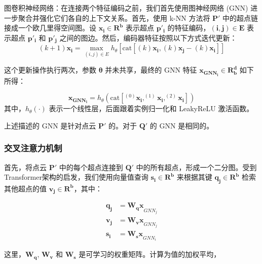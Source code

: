图卷积神经网络：在连接两个特征编码之前，我们首先使用图神经网络 (GNN) 进一步聚合并强化它们各自的上下文关系。首先，使用 k-NN 方法将 $\boldsymbol{P'}$ 中的超点链接成一个欧几里得空间图。设 $\boldsymbol{x_i \in R^b}$ 表示超点 $\boldsymbol{p'_i}$ 的特征编码，$\boldsymbol{(i, j) \in E}$ 表示超点 $\boldsymbol{p'_i}$ 和 $\boldsymbol{p'_j}$ 之间的图边。然后，编码器特征按照以下方式迭代更新：
\begin{equation}
    (k+1)\boldsymbol{x_i} = \max_{(i,j) \in E} h_{\theta} \left[ \text{cat} \left[(k)\boldsymbol{x_i}, (k)\boldsymbol{x_j} - (k)\boldsymbol{x_i} \right] \right]
\end{equation}

这个更新操作执行两次，参数 $\boldsymbol{\theta}$ 并未共享，最终的 GNN 特征 $\boldsymbol{x_{GNN_i} \in R^{d}_b}$ 如下所得：

\begin{equation}
\boldsymbol{x_{GNN_i}} = h_{\theta}(\text{cat}[^{(0)}\boldsymbol{x_i}, ^{(1)}\boldsymbol{x_i}, ^{(2)}\boldsymbol{x_i}])
\end{equation}
其中，$h_{\theta}(·)$ 表示一个线性层，后面跟着实例归一化和 LeakyReLU 激活函数。

上述描述的 GNN 是针对点云 $\boldsymbol{P'}$ 的。对于 $\boldsymbol{Q'}$ 的 GNN 是相同的。

\subsubsection{交叉注意力机制}首先，将点云 $\boldsymbol{P'}$ 中的每个超点连接到 $\boldsymbol{Q'}$ 中的所有超点，形成一个二分图。受到Transformer架构的启发，我们使用向量值查询 $\boldsymbol{s_i \in R^b}$ 来根据其键 $\boldsymbol{q_j \in R^b}$ 检索其他超点的值 $\boldsymbol{v_j \in R^b}$，其中：

\begin{equation}
\begin{aligned}
\boldsymbol{q_j} &= \boldsymbol{W_q x}_{GNN_j} \\
\boldsymbol{v_j} &= \boldsymbol{W_v x}_{GNN_j} \\
\boldsymbol{s_i} &= \boldsymbol{W_s x}_{GNN_i}
\end{aligned}
\end{equation}

这里，$\boldsymbol{W_q}$, $\boldsymbol{W_v}$ 和 $\boldsymbol{W_s}$ 是可学习的权重矩阵。计算为值的加权平均，

